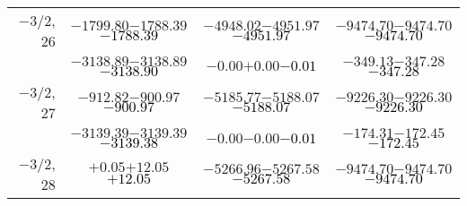 \documentclass[compress]{beamer}
\begin{document}
\begin{frame}
{\begin{tabular}{r | c | c | c}
$-$3/2, 26 & $-1799.80$\hspace{0.1 cm}$-1788.39$\hspace{0.1 cm}\textcolor{black}{$-1788.39$} & $-4948.02$\hspace{0.1 cm}$-4951.97$\hspace{0.1 cm}\textcolor{black}{$-4951.97$} & $-9474.70$\hspace{0.1 cm}$-9474.70$\hspace{0.1 cm}\textcolor{black}{$-9474.70$} \\
           & $-3138.89$\hspace{0.1 cm}$-3138.89$\hspace{0.1 cm}\textcolor{black}{$-3138.90$} & $-0.00$\hspace{0.1 cm}$+0.00$\hspace{0.1 cm}\textcolor{black}{$-0.01$} & $-349.13$\hspace{0.1 cm}$-347.28$\hspace{0.1 cm}\textcolor{black}{$-347.28$} \\
$-$3/2, 27 & $-912.82$\hspace{0.1 cm}$-900.97$\hspace{0.1 cm}\textcolor{black}{$-900.97$} & $-5185.77$\hspace{0.1 cm}$-5188.07$\hspace{0.1 cm}\textcolor{black}{$-5188.07$} & $-9226.30$\hspace{0.1 cm}$-9226.30$\hspace{0.1 cm}\textcolor{black}{$-9226.30$} \\
           & $-3139.39$\hspace{0.1 cm}$-3139.39$\hspace{0.1 cm}\textcolor{black}{$-3139.38$} & $-0.00$\hspace{0.1 cm}$-0.00$\hspace{0.1 cm}\textcolor{black}{$-0.01$} & $-174.31$\hspace{0.1 cm}$-172.45$\hspace{0.1 cm}\textcolor{black}{$-172.45$} \\
$-$3/2, 28 & $+0.05$\hspace{0.1 cm}$+12.05$\hspace{0.1 cm}\textcolor{black}{$+12.05$} & $-5266.96$\hspace{0.1 cm}$-5267.58$\hspace{0.1 cm}\textcolor{black}{$-5267.58$} & $-9474.70$\hspace{0.1 cm}$-9474.70$\hspace{0.1 cm}\textcolor{black}{$-9474.70$} \\

\end{tabular}}
\end{frame}
\end{document}
